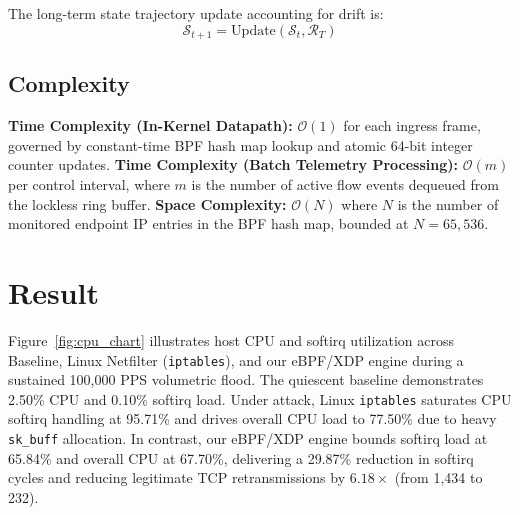 \documentclass[conference]{IEEEtran}
\begin{document}
The long-term state trajectory update accounting for drift is:
\begin{equation}
\mathcal{S}_{t+1} = \text{Update}(\mathcal{S}_t, \mathcal{R}_T) \label{eq:update}
\end{equation}

\subsection{Complexity}
\textbf{Time Complexity (In-Kernel Datapath):} $\mathcal{O}(1)$ for each ingress frame, governed by constant-time BPF hash map lookup and atomic 64-bit integer counter updates.
\textbf{Time Complexity (Batch Telemetry Processing):} $\mathcal{O}(m)$ per control interval, where $m$ is the number of active flow events dequeued from the lockless ring buffer.
\textbf{Space Complexity:} $\mathcal{O}(N)$ where $N$ is the number of monitored endpoint IP entries in the BPF hash map, bounded at $N=65,536$.

\section{Result}
Figure~\ref{fig:cpu_chart} illustrates host CPU and softirq utilization across Baseline, Linux Netfilter (\texttt{iptables}), and our eBPF/XDP engine during a sustained 100,000 PPS volumetric flood. The quiescent baseline demonstrates 2.50\% CPU and 0.10\% softirq load. Under attack, Linux \texttt{iptables} saturates CPU softirq handling at 95.71\% and drives overall CPU load to 77.50\% due to heavy \texttt{sk\_buff} allocation. In contrast, our eBPF/XDP engine bounds softirq load at 65.84\% and overall CPU at 67.70\%, delivering a 29.87\% reduction in softirq cycles and reducing legitimate TCP retransmissions by $6.18\times$ (from 1,434 to 232).
\end{document}
